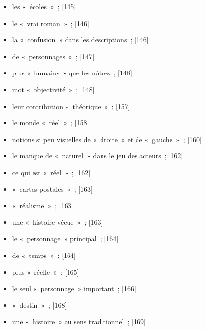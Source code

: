 \documentclass[12pt, a4paper]{article}
\begin{document}
\begin{itemize}
	\item les «~écoles~»{\color{gray}~; [145]}

	\item le «~vrai roman~»{\color{gray}~; [146]}

	\item la «~confusion~» dans les descriptions{\color{gray}~; [146]}

	\item de «~personnages~»{\color{gray}~; [147]}

	\item plus «~humains~» que les nôtres{\color{gray}~; [148]}

	\item mot «~objectivité~»{\color{gray}~; [148]}

	\item leur contribution «~théorique~»{\color{gray}~; [157]}

	\item le monde «~réel~»{\color{gray}~; [158]}

	\item notions si peu visuelles de «~droite~» et de «~gauche~»{\color{gray}~; [160]}

	\item le manque de «~naturel~» dans le jeu des acteurs{\color{gray}~; [162]}

	\item ce qui est «~réel~»{\color{gray}~; [162]}

	\item «~cartes-postales~»{\color{gray}~; [163]}

	\item «~réalisme~»{\color{gray}~; [163]}

	\item une «~histoire vécue~»{\color{gray}~; [163]}

	\item le «~personnage~» principal{\color{gray}~; [164]}

	\item de «~temps~»{\color{gray}~; [164]}

	\item plus «~réelle~»{\color{gray}~; [165]}

	\item le seul «~personnage~» important{\color{gray}~; [166]}

	\item «~destin~»{\color{gray}~; [168]}

	\item une «~histoire~» au sens traditionnel{\color{gray}~; [169]}


\end{itemize}
\end{document}

